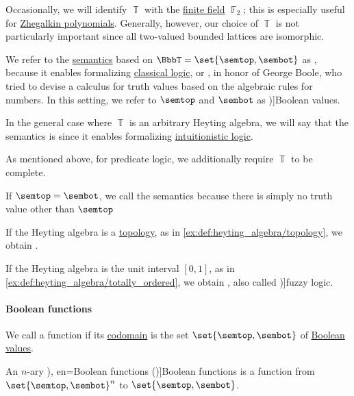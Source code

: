 \begin{definition}
\begin{thmenum}
    Occasionally, we will identify \( \BbbT \) with the \hyperref[def:finite_field]{finite field} \( \BbbF_2 \); this is especially useful for \hyperref[def:zhegalkin_polynomial]{Zhegalkin polynomials}. Generally, however, our choice of \( \BbbT \) is not particularly important since all two-valued bounded lattices are isomorphic.

    We refer to the \hyperref[con:syntax_semantics_duality]{semantics} based on \( \BbbT = \set{ \semtop, \sembot } \) as , because it enables formalizing \hyperref[con:classical_logic]{classical logic}, or , in honor of George Boole, who tried to devise a calculus for truth values based on the algebraic rules for numbers. In this setting, we refer to \( \semtop \) and \( \sembot \) as \term[en=Boolean values (\cite[218]{DaveyPriestley2002LatticeTheory})]{Boolean values}.

     In the general case where \( \BbbT \) is an arbitrary Heyting algebra, we will say that the semantics is  since it enables formalizing \hyperref[con:intuitionistic_logic]{intuitionistic logic}.

    As mentioned above, for predicate logic, we additionally require \( \BbbT \) to be complete.

     If \( \semtop = \sembot \), we call the semantics  because there is simply no truth value other than \( \semtop \)

     If the Heyting algebra is a \hyperref[def:topological_space]{topology}, as in \cref{ex:def:heyting_algebra/topology}, we obtain .

     If the Heyting algebra is the unit interval \( [0, 1] \), as in \cref{ex:def:heyting_algebra/totally_ordered}, we obtain , also called \term[en=fuzzy logic (\cite[17]{Rosen2019DiscreteMathematics})]{fuzzy logic}.
  \end{thmenum}
\end{definition}

\paragraph{Boolean functions}

\begin{definition}\label{def:boolean_function}
  We call a function  if its \hyperref[def:set_valued_function/codomain]{codomain} is the set \( \set{ \semtop, \sembot } \) of \hyperref[def:truth_value_algebra/classical]{Boolean values}.

  An \( n \)-ary \term[ru=булевые функции (\cite[9]{Яблонский2003ДискретнаяМатематика}), en=Boolean functions (\cite[847]{Rosen2019DiscreteMathematics})]{Boolean functions} is a function from \( \set{ \semtop, \sembot }^n \) to \( \set{ \semtop, \sembot } \).
\end{definition}

